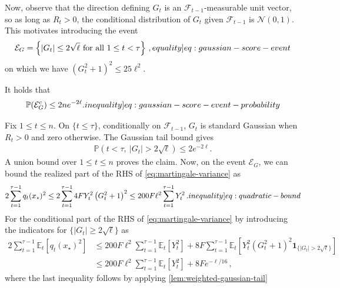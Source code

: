 \documentclass[12pt,cleveref]{jmlr}
\renewenvironment{proof}[1][\proofname]
{\par\noindent{\bfseries\upshape #1\ }}
{\jmlrQED}
\newcommand{\eqlabel}[1]{\label[equality]{#1}}
\newcommand{\ineqlabel}[1]{\label[inequality]{#1}}
\newcommand{\E}{\mathbb E}
\newcommand{\Pp}{\mathbb P}
\newcommand{\F}{\mathcal F}
\newcommand{\N}{\mathcal N}
\newcommand{\1}{\mathbf 1}
\begin{document}
Now, observe that the direction defining $G_t$ is an
$\F_{t-1}$-measurable unit vector, so as long as $R_t>0$, the conditional distribution of
$G_t$ given $\F_{t-1}$ is $\N(0,1)$.
This motivates introducing the event
\begin{align}
    \mathcal E_G
    =\left\{
        |G_t|\leq2\sqrt\ell
        \text{ for all }1\leq t< \tau
    \right\}
    \,,
    \eqlabel{eq:gaussian-score-event}
\end{align}
on which we have $(G_t^2+1)^2\leq25\ell^2$.
\begin{lemma}
    \label{lem:gaussian-score-event}
    It holds that
    \begin{align}
        \Pp(\mathcal E_G^c)\leq2ne^{-2\ell}.
        \ineqlabel{eq:gaussian-score-event-probability}
    \end{align}
\end{lemma}
\begin{proof}
    Fix $1\leq t\leq n$. On $\{t\leq\tau\}$, conditionally on
    $\F_{t-1}$, $G_t$ is standard Gaussian when $R_t>0$ and zero otherwise.
    The Gaussian tail bound gives
    \begin{align}
        \Pp\left(t<\tau,\ |G_t|>2\sqrt\ell\right)
        \leq2e^{-2\ell}.
    \end{align}
    A union bound over $1\leq t\leq n$ proves the claim.
\end{proof}
Now, on the event $\mathcal E_G$, we can bound the realized part of the RHS of \cref{eq:martingale-variance} as
\begin{align}
    2\sum_{t=1}^{\tau-1}
    q_t(x_\star)^2
    \leq
    2\sum_{t=1}^{\tau-1}
    4F Y_t^2\left(G_t^2+1\right)^2
    \leq
    200 F \ell^2 \sum_{t=1}^{\tau-1}
    Y_t^2
    \,.
    \ineqlabel{eq:quadratic-bound}
\end{align}
For the conditional part of the RHS of \cref{eq:martingale-variance} by introducing the indicators for $\{|G_t|\geq 2\sqrt{\ell}\}$ as
\begin{align}
    2\sum_{t=1}^{\tau-1}
    \E_t[q_t(x_\star)^2]
    & \leq
    200 F \ell^2 \sum_{t=1}^{\tau-1}
    \E_t[Y_t^2]
    +
    8F \sum_{t=1}^{\tau-1}\E_t\left[Y_t^2(G_t^2+1)^2\1_{\{|G_t|>2\sqrt\ell\}}\right]
    \\
    & \leq
    200 F \ell^2 \sum_{t=1}^{\tau-1}
    \E_t[Y_t^2]
    +
    8Fe^{-\ell/16}
    \,,
\end{align}
where the last inequality follows by applying \cref{lem:weighted-gaussian-tail}
\end{document}
